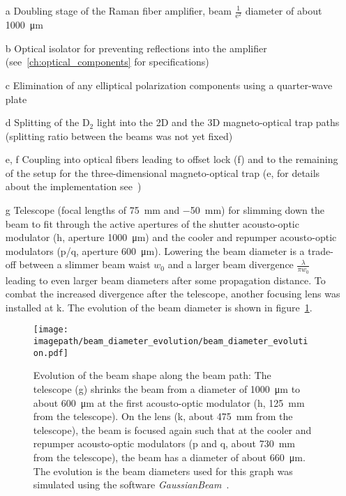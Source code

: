 \begin{itemize}
    \item[a] Doubling stage of the Raman fiber amplifier, beam $\frac{1}{\text{e}^2}$ diameter of about \SI{1000}{\micro\meter}

    \item[b] Optical isolator for preventing reflections into the amplifier (see~\ref{ch:optical_components} for specifications)

    \item[c] Elimination of any elliptical polarization components using a quarter-wave plate

    \item[d] Splitting of the D$_2$ light into the 2D and the 3D magneto-optical trap paths (splitting ratio between the beams was not yet fixed)

    \item[e, f] Coupling into optical fibers leading to offset lock (f) and to the remaining of the setup for the three-dimensional magneto-optical trap (e, for details about the implementation see~\cite{qesja_design_2022})
    
    \item[g] Telescope (focal lengths of \SI[]{+75}{\milli\meter} and \SI[]{-50}{\milli\meter}) for slimming down the beam to fit through the active apertures of the shutter acousto-optic modulator (h, aperture \SI[]{1000}{\micro\meter}) and the cooler and repumper acousto-optic modulators (p/q, aperture \SI[]{600}{\micro\meter}). Lowering the beam diameter is a trade-off between a slimmer beam waist $w_0$ and a larger beam divergence $\frac{\lambda}{\pi w_0}$ leading to even larger beam diameters after some propagation distance. To combat the increased divergence after the telescope, another focusing lens was installed at k. The evolution of the beam diameter is shown in figure~\ref{fig:beam_diameter_evolution}.
    
\begin{figure}
    \centering
    \texttt{[image: \\imagepath/beam\_diameter\_evolution/beam\_diameter\_evolution.pdf]}
    \caption{Evolution of the beam shape along the beam path: The telescope (g) shrinks the beam from a diameter of \SI[]{1000}{\micro\meter} to about \SI[]{600}{\micro\meter} at the first acousto-optic modulator (h, \SI[]{125}{\milli\meter} from the telescope). On the lens (k, about \SI{475}{\milli\meter} from the telescope), the beam is focused again such that at the cooler and repumper acousto-optic modulators (p and q, about \SI[]{730}{\milli\meter} from the telescope), the beam has a diameter of about \SI[]{660}{\micro\meter}. The evolution is the beam diameters used for this graph was simulated using the software \textit{GaussianBeam}~\cite{noauthor_gaussianbeam_nodate}.}
    \label{fig:beam_diameter_evolution}
\end{figure}


\end{itemize}
